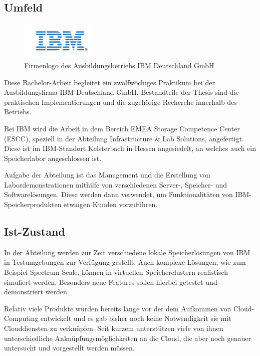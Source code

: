 \subsection{Umfeld} \label{subsec:enviroment}

\begin{figure}
	\begin{center}
		\includegraphics[width=0.32\textwidth]{images/firma-deckblatt}
	\end{center}
	\caption{Firmenlogo des Ausbildungsbetriebs IBM Deutschland GmbH}
\end{figure}

Diese Bachelor-Arbeit begleitet ein zwölfwöchiges Praktikum bei der Ausbildungsfirma IBM Deutschland GmbH. Bestandteile der Thesis sind die praktischen Implementierungen und die zugehörige Recherche innerhalb des Betriebs. 

Bei IBM wird die Arbeit in dem Bereich EMEA Storage Competence Center (ESCC), speziell in der Abteilung Infrastructure \& Lab Solutions, angefertigt. Diese ist im IBM-Standort Kelsterbach in Hessen angesiedelt, an welches auch ein Speicherlabor angeschlossen ist.

Aufgabe der Abteilung ist das Management und die Erstellung von Labordemonstrationen mithilfe von verschiedenen Server-, Speicher- und Softwarelösungen. Diese werden dann verwendet, um Funktionalitäten von IBM-Speicherprodukten etwaigen Kunden vorzuführen.

\subsection{Ist-Zustand}

In der Abteilung werden zur Zeit verschiedene lokale Speicherlösungen von IBM in Testumgebungen zur Verfügung gestellt. Auch komplexe Lösungen, wie zum Beispiel Spectrum Scale, können in virtuellen Speicherclustern realistisch simuliert werden. Besonders neue Features sollen hierbei getestet und demonstriert werden.

Relativ viele Produkte wurden bereits lange vor der dem Aufkommen von Cloud-Computing entwickelt und es gab bisher noch keine Notwendigkeit sie mit Clouddiensten zu verknüpfen. Seit kurzem unterstützen viele von ihnen unterschiedliche Anknüpfungsmöglichkeiten an die Cloud, die aber noch genauer untersucht und vorgestellt werden müssen.

